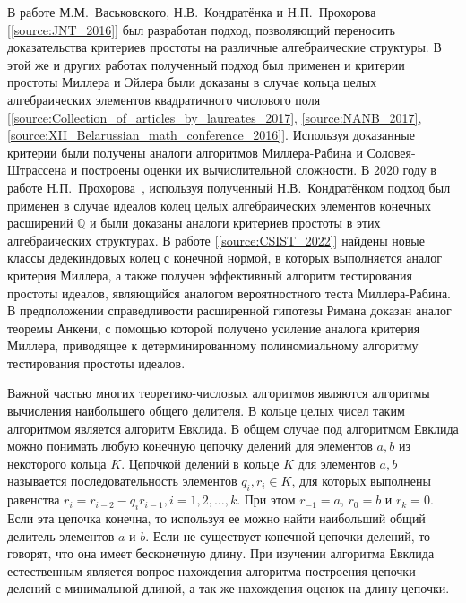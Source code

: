 \documentclass[_00_dissertation.tex]{subfiles}
\begin{document}
В работе М.М.~Васьковского, Н.В.~Кондратёнка и Н.П.~Прохорова [\ref{source:JNT_2016}] был разработан подход, позволяющий переносить доказательства критериев простоты на различные алгебраические структуры.
В этой же и других работах полученный подход был применен и критерии простоты Миллера и Эйлера были доказаны в случае кольца целых алгебраических элементов квадратичного числового поля [\ref{source:Collection_of_articles_by_laureates_2017}, \ref{source:NANB_2017}, \ref{source:XII_Belarussian_math_conference_2016}].
Используя доказанные критерии были получены аналоги алгоритмов Миллера-Рабина и Соловея-Штрассена и построены оценки их вычислительной сложности.
В 2020 году в работе Н.П.~Прохорова~\cite{source:Prochorov}, используя полученный Н.В.~Кондратёнком подход был применен в случае идеалов колец целых алгебраических элементов конечных расширений $\mathbb{Q}$ и были доказаны аналоги критериев простоты в этих алгебраических структурах.
В работе [\ref{source:CSIST_2022}] найдены новые классы дедекиндовых колец с конечной нормой, в которых выполняется аналог критерия Миллера, а также получен эффективный алгоритм тестирования простоты идеалов, являющийся аналогом вероятностного теста Миллера-Рабина.
В предположении справедливости расширенной гипотезы Римана доказан аналог теоремы Анкени, с помощью которой получено усиление аналога критерия Миллера, приводящее к детерминированному полиномиальному алгоритму тестирования простоты идеалов.


Важной частью многих теоретико-числовых алгоритмов являются алгоритмы вычисления наибольшего общего делителя.
В кольце целых чисел таким алгоритмом является алгоритм Евклида.
В общем случае под алгоритмом Евклида можно понимать любую конечную цепочку делений для элементов $a, b$ из некоторого кольца $K$.
Цепочкой делений в кольце $K$ для элементов $a, b$ называется последовательность элементов $q_i, r_i \in K$, для которых выполнены равенства $r_i=r_{i-2}-q_i r_{i-1}, i = 1, 2, \ldots, k$.
При этом $r_{-1} = a$, $r_0 = b$ и $r_k=0$.
Если эта цепочка конечна, то используя ее можно найти наибольший общий делитель элементов $a$ и $b$.
Если не существует конечной цепочки делений, то говорят, что она имеет бесконечную длину.
При изучении алгоритма Евклида естественным является вопрос нахождения алгоритма построения цепочки делений с минимальной длиной, а так же нахождения оценок на длину цепочки.
\end{document}
